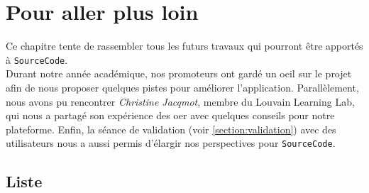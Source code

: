 \chapter{Pour aller plus loin}
\label{chapter:pourAllerPlusLoin}

Ce chapitre tente de rassembler tous les futurs travaux qui pourront être apportés à \texttt{SourceCode}.\\

Durant notre année académique, nos promoteurs ont gardé un oeil sur le projet afin de nous proposer quelques pistes pour améliorer l'application.
Parallèlement, nous avons pu rencontrer \textit{Christine Jacqmot}, membre du Louvain Learning Lab, qui nous a partagé son expérience des \gls{oer} avec quelques conseils pour notre plateforme. Enfin, la séance de validation (voir \ref{section:validation}) avec des utilisateurs nous a aussi permis d'élargir nos perspectives pour \texttt{SourceCode}.

\section{Liste}

